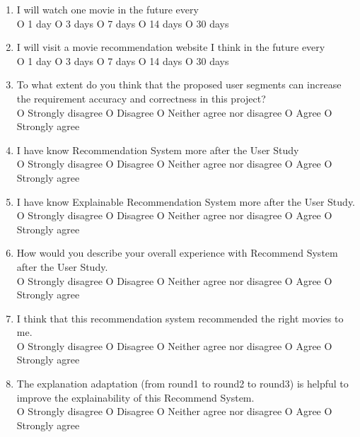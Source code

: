 \begin{enumerate}
\item I will watch one movie in the future every \\

O 1 day  O 3 days O 7 days O 14 days O 30 days

\item I will visit a movie recommendation website I think in the future every \\

O 1 day  O 3 days O 7 days O 14 days O 30 days

\item To what extent do you think that the proposed user segments can increase the requirement accuracy and correctness in this project? \\

O Strongly disagree O Disagree O Neither agree nor disagree O Agree O Strongly agree

\item I have know Recommendation System more after the User Study\\  

O Strongly disagree O Disagree O Neither agree nor disagree O Agree O Strongly agree

\item I have know Explainable Recommendation System more after the User Study. \\

O Strongly disagree O Disagree O Neither agree nor disagree O Agree O Strongly agree

\item How would you describe your overall experience with Recommend System after the User Study. \\

O Strongly disagree O Disagree O Neither agree nor disagree O Agree O Strongly agree

\item I think that this recommendation system recommended the right movies to me. \\

O Strongly disagree O Disagree O Neither agree nor disagree O Agree O Strongly agree

\item The explanation adaptation (from round1 to round2 to round3) is helpful to improve the explainability of this Recommend System.\\

O Strongly disagree O Disagree O Neither agree nor disagree O Agree O Strongly agree


\end{enumerate}
